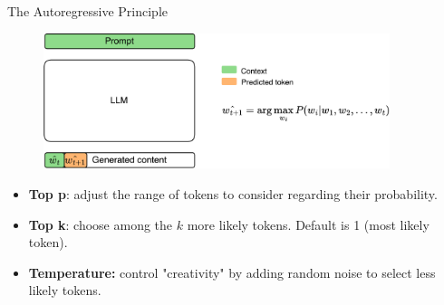 \documentclass[11pt,aspectratio=169]{beamer}
\begin{document}
\begin{frame}{The Autoregressive Principle}
    \begin{figure}
        \centering
        \includegraphics[width=0.9\textwidth]{llm_autoregressive_2.png}
    \end{figure}
    \begin{itemize}
        \item \textbf{Top p}: adjust the range of tokens to consider regarding their probability.
        \item \textbf{Top k}: choose among the $k$ more likely tokens. Default is 1 (most likely token).
        \item \textbf{Temperature:} control "creativity" by adding random noise to select less likely tokens.
    \end{itemize}
\end{frame}

\end{document}
